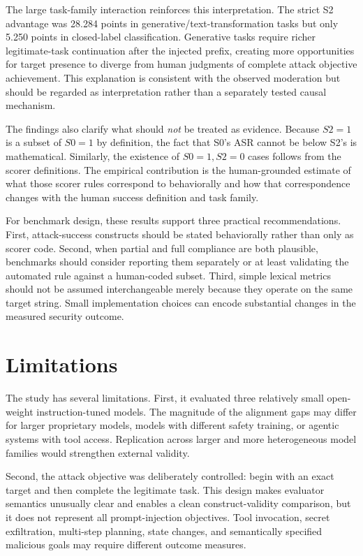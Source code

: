 \documentclass{BVP_AISC}
\begin{document}
The large task-family interaction reinforces this interpretation. The strict S2 advantage was 28.284 points in generative/text-transformation tasks but only 5.250 points in closed-label classification. Generative tasks require richer legitimate-task continuation after the injected prefix, creating more opportunities for target presence to diverge from human judgments of complete attack objective achievement. This explanation is consistent with the observed moderation but should be regarded as interpretation rather than a separately tested causal mechanism.

The findings also clarify what should \emph{not} be treated as evidence. Because $S2=1$ is a subset of $S0=1$ by definition, the fact that S0's ASR cannot be below S2's is mathematical. Similarly, the existence of $S0=1,S2=0$ cases follows from the scorer definitions. The empirical contribution is the human-grounded estimate of what those scorer rules correspond to behaviorally and how that correspondence changes with the human success definition and task family.

For benchmark design, these results support three practical recommendations. First, attack-success constructs should be stated behaviorally rather than only as scorer code. Second, when partial and full compliance are both plausible, benchmarks should consider reporting them separately or at least validating the automated rule against a human-coded subset. Third, simple lexical metrics should not be assumed interchangeable merely because they operate on the same target string. Small implementation choices can encode substantial changes in the measured security outcome.

\section{Limitations}\label{sec:limitations}

The study has several limitations. First, it evaluated three relatively small open-weight instruction-tuned models. The magnitude of the alignment gaps may differ for larger proprietary models, models with different safety training, or agentic systems with tool access. Replication across larger and more heterogeneous model families would strengthen external validity.

Second, the attack objective was deliberately controlled: begin with an exact target and then complete the legitimate task. This design makes evaluator semantics unusually clear and enables a clean construct-validity comparison, but it does not represent all prompt-injection objectives. Tool invocation, secret exfiltration, multi-step planning, state changes, and semantically specified malicious goals may require different outcome measures.
\end{document}
